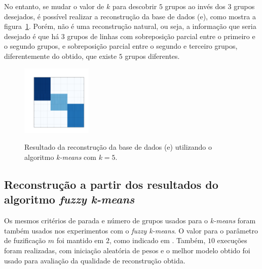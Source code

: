 \documentclass[
    12pt,                %
    oneside,            %
    a4paper,            %
    english,            %
    brazil                %
    ]{abntex2ppgsi}
\begin{document}
No entanto, se mudar o valor de $k$ para descobrir $5$ grupos ao invés dos $3$ grupos desejados, é possível realizar a reconstrução da base de dados (e), como mostra a figura~\ref{fig:reconstruction-2:kmeans}.
Porém, não é uma reconstrução natural, ou seja, a informação que seria desejado é que há $3$ grupos de linhas com sobreposição parcial entre o primeiro e o segundo grupos, e sobreposição parcial entre o segundo e terceiro grupos, diferentemente do obtido, que existe $5$ grupos diferentes.

\begin{figure}[H]
\centering
    \caption{Resultado da reconstrução da base de dados (e) utilizando o algoritmo \textit{k-means} com $k = 5$.}
    \includegraphics[width=0.3\textwidth]{img/e-reconstruction-2-kmeans.png}
    \label{fig:reconstruction-2:kmeans}
\end{figure}

\subsection{Reconstrução a partir dos resultados do algoritmo \textit{fuzzy k-means}}
\label{subsec:results-reconstruction-fkmeans}

Os mesmos critérios de parada e número de grupos usados para o \textit{k-means} foram também usados nos experimentos com o \textit{fuzzy k-means}.
O valor para o parâmetro de fuzificação $m$ foi mantido em $2$, como indicado em .
Também, $10$ execuções foram realizadas, com iniciação aleatória de pesos e o melhor modelo obtido foi usado para avaliação da qualidade de reconstrução obtida.

\end{document}
